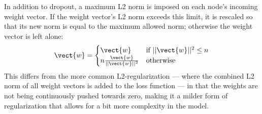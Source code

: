 In addition to dropout, a maximum L2 norm is imposed on each node's incoming
weight vector. If the weight vector's L2 norm exceeds this limit, it is rescaled
so that its new norm is equal to the maximum allowed norm; otherwise the weight
vector is left alone:
\begin{equation}
  \label{eq:norm}
  \vect{w} = \begin{cases}
    \vect{w}\,                          & \text{if } ||\vect{w}||^2 \leq n \\
    n \frac{\vect{w}}{||\vect{w}||^2} & \text{otherwise}
  \end{cases}
\end{equation}
This differs from the more common L2-regularization --- where the combined L2
norm of all weight vectors is added to the loss function --- in that the weights
are not being continuously pushed towards zero, making it a milder form of
regularization that allows for a bit more complexity in the model.


